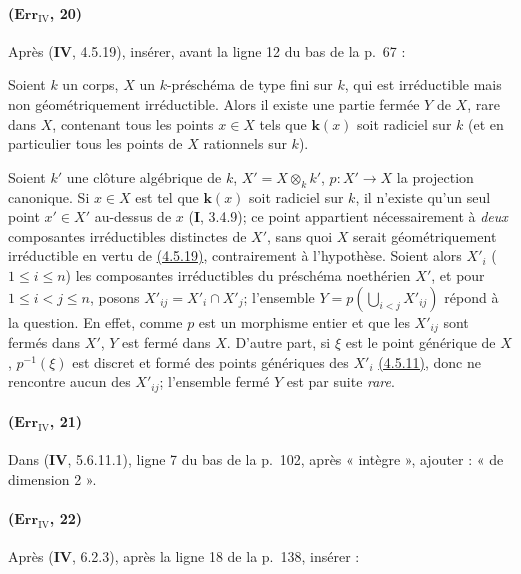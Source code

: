 \paragraph{($\mathbf{Err}_{\mathrm{IV}}$, 20)}
Après (\textbf{IV}, 4.5.19), insérer, avant la ligne 12 du bas de la p.~67 :

\begin{corollary}[4.5.19.3]
\label{IV.4.5.19.3}
Soient $k$ un corps, $X$ un $k$-préschéma de type fini sur $k$, qui est
irréductible mais non géométriquement irréductible. Alors il existe une
partie fermée $Y$ de $X$, rare dans $X$, contenant tous les points
$x\in X$ tels que $\boldsymbol{k}(x)$ soit radiciel sur $k$ (et en particulier tous
les points de $X$ rationnels sur $k$).
\end{corollary}

Soient $k'$ une clôture algébrique de $k$, $X'=X\otimes_kk'$,
$p:X'\to X$ la projection canonique. Si $x\in X$ est tel que $\boldsymbol{k}(x)$
soit radiciel sur $k$, il n'existe qu'un seul point $x'\in X'$ au-dessus
de $x$ (\textbf{I}, 3.4.9); ce point appartient nécessairement à \emph{deux} composantes
irréductibles distinctes de $X'$, sans quoi $X$ serait géométriquement
irréductible en vertu de
{\hyperref[canon-index.ega4.c04.prop.4-5-19]{(4.5.19)}}, contrairement à
l'hypothèse. Soient alors $X'_i$ ($1\leq i\leq n$) les composantes
irréductibles du préschéma noethérien $X'$, et pour
$1\leq i<j\leq n$, posons $X'_{ij}=X'_i\cap X'_j$; l'ensemble $Y=p(\bigcup_{i<j}X'_{ij})$
répond à la question. En effet, comme $p$ est un morphisme entier et
que les $X'_{ij}$ sont fermés dans $X'$, $Y$ est fermé dans $X$.
D'autre part, si $\xi$ est le point générique de $X$, $p^{-1}(\xi)$
est discret et formé des points génériques des $X'_i$
{\hyperref[canon-index.ega4.c04.cor.4-5-11]{(4.5.11)}}, donc ne rencontre aucun
des $X'_{ij}$; l'ensemble fermé $Y$ est par suite \emph{rare}.

\paragraph{($\mathbf{Err}_{\mathrm{IV}}$, 21)}
Dans (\textbf{IV}, 5.6.11.1), ligne 7 du bas de la p.~102, après « intègre »,
ajouter : « de dimension 2 ».

\paragraph{($\mathbf{Err}_{\mathrm{IV}}$, 22)}
Après (\textbf{IV}, 6.2.3), après la ligne 18 de la p.~138, insérer :

